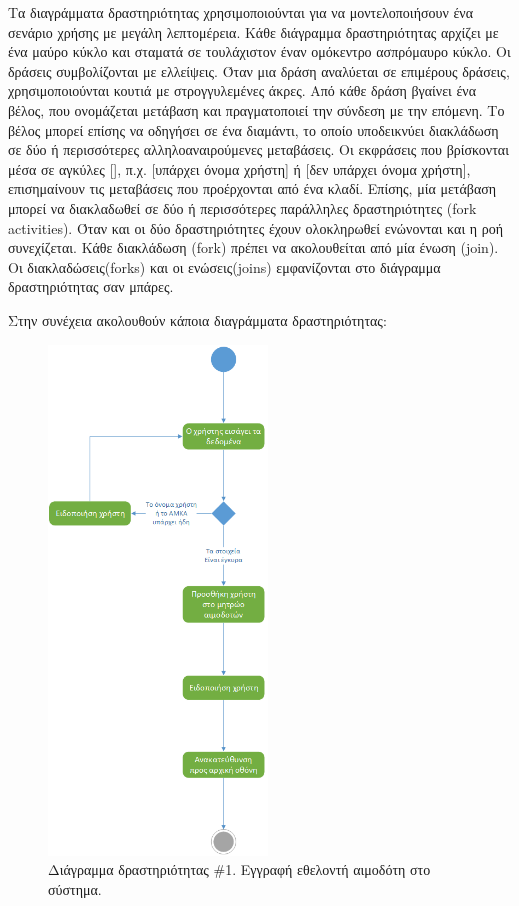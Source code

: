 		Τα διαγράμματα δραστηριότητας χρησιμοποιούνται για να μοντελοποιήσουν ένα σενάριο χρήσης με μεγάλη λεπτομέρεια. Κάθε διάγραμμα δραστηριότητας αρχίζει με ένα μαύρο κύκλο και σταματά σε τουλάχιστον έναν ομόκεντρο ασπρόμαυρο κύκλο. Οι δράσεις συμβολίζονται με ελλείψεις. Όταν μια δράση αναλύεται σε επιμέρους δράσεις, χρησιμοποιούνται κουτιά με στρογγυλεμένες άκρες. Από κάθε δράση βγαίνει ένα βέλος, που ονομάζεται μετάβαση και πραγματοποιεί την σύνδεση με την επόμενη. Το βέλος μπορεί επίσης να οδηγήσει σε ένα διαμάντι, το οποίο υποδεικνύει διακλάδωση σε δύο ή περισσότερες αλληλοαναιρούμενες μεταβάσεις. Οι εκφράσεις που βρίσκονται μέσα σε αγκύλες [], π.χ. [υπάρχει όνομα χρήστη] ή [δεν υπάρχει όνομα χρήστη], επισημαίνουν τις μεταβάσεις που προέρχονται από ένα κλαδί. Επίσης, μία μετάβαση μπορεί να διακλαδωθεί σε δύο ή περισσότερες παράλληλες δραστηριότητες (fork activities). Όταν και οι δύο δραστηριότητες έχουν ολοκληρωθεί ενώνονται και  η ροή συνεχίζεται. Κάθε διακλάδωση (fork) πρέπει να ακολουθείται από μία ένωση (join). Οι διακλαδώσεις(forks) και οι ενώσεις(joins) εμφανίζονται στο διάγραμμα δραστηριότητας σαν μπάρες.

		Στην συνέχεια ακολουθούν κάποια διαγράμματα δραστηριότητας:
		\begin{figure}[H]
		    \centering
		    \includegraphics[width=0.52\textwidth]{Register.png}
		    \caption{Διάγραμμα δραστηριότητας \#1. Εγγραφή εθελοντή αιμοδότη στο σύστημα.}
		    \label{fig:register}
		\end{figure}
		
